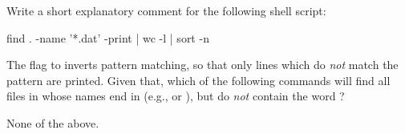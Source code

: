 \begin{challenge}
  Write a short explanatory comment for the following shell script:

\begin{VerbIn}
find . -name '*.dat' -print | wc -l | sort -n
\end{VerbIn}
\end{challenge}

\begin{challenge}
  The  flag to  inverts pattern matching, so
  that only lines which do \emph{not} match the pattern are printed.
  Given that, which of the following commands will find all files in
   whose names end in  (e.g.,
   or ), but do \emph{not}
  contain the word ?

  \begin{swcenumerate}
  \item
  \item
  \item
  \item
    None of the above.
  \end{swcenumerate}
\end{challenge}
